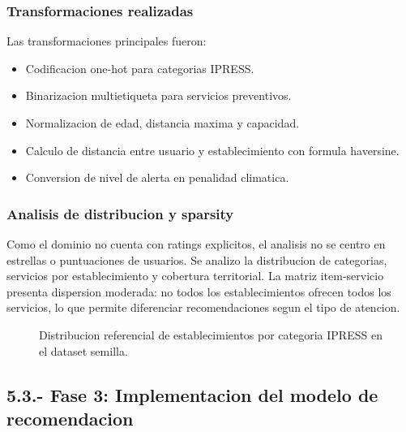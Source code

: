 \documentclass[12pt,a4paper]{article}
\begin{document}
\subsubsection{Transformaciones realizadas}
Las transformaciones principales fueron:

\begin{itemize}[leftmargin=*]
  \item Codificacion one-hot para categorias IPRESS.
  \item Binarizacion multietiqueta para servicios preventivos.
  \item Normalizacion de edad, distancia maxima y capacidad.
  \item Calculo de distancia entre usuario y establecimiento con formula haversine.
  \item Conversion de nivel de alerta en penalidad climatica.
\end{itemize}

\subsubsection{Analisis de distribucion y sparsity}
Como el dominio no cuenta con ratings explicitos, el analisis no se centro en estrellas o puntuaciones de usuarios. Se analizo la distribucion de categorias, servicios por establecimiento y cobertura territorial. La matriz item-servicio presenta dispersion moderada: no todos los establecimientos ofrecen todos los servicios, lo que permite diferenciar recomendaciones segun el tipo de atencion.

\begin{figure}[H]
\centering
{}
\caption{Distribucion referencial de establecimientos por categoria IPRESS en el dataset semilla.}
\label{fig:categorias}
\end{figure}

\subsection{5.3.- Fase 3: Implementacion del modelo de recomendacion}
\end{document}
